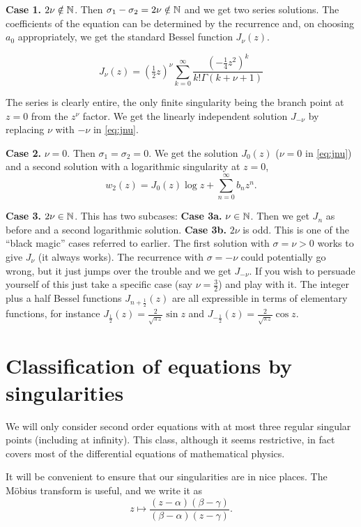 \documentclass{notes}
\theoremstyle{plain}
\begin{document}
\textbf{Case 1.}  $2 \nu \notin \mathbb{N}$.  Then $\sigma_1 - \sigma_2 = 2
\nu \notin \mathbb{N}$ and we get two series solutions.  The coefficients of
the equation can be determined by the recurrence and, on choosing
$a_0$ appropriately, we get the standard Bessel function $J_\nu(z)$.

\begin{equation}\label{eq:jnu}
J_\nu(z) = \left( \tfrac{1}{2} z \right)^\nu
\sum_{k=0}^\infty \frac{\left( - \tfrac{1}{4} z^2 \right)^k}
{k! \Gamma(k+\nu+1)}
\end{equation}

The series is clearly entire, the only finite singularity being the branch
point at $z=0$ from the $z^\nu$ factor. We get the linearly independent
solution $J_{-\nu}$ by replacing $\nu$ with $-\nu$ in \eqref{eq:jnu}.

\textbf{Case 2.}  $\nu = 0$.  Then $\sigma_1 = \sigma_2 = 0$.  We get
the solution $J_0(z)$ ($\nu = 0$ in \eqref{eq:jnu}) and a second
solution with a logarithmic singularity at $z=0$,
\[
w_2(z) = J_0(z) \log z + \sum_{n=0}^\infty b_n z^n.
\]

\textbf{Case 3.}  $2 \nu \in \mathbb{N}$.  This has two subcases:
\textbf{Case 3a.} $\nu \in \mathbb{N}$.  Then we get $J_n$ as before and a
second logarithmic solution. \textbf{Case 3b.}  $2 \nu$ is odd.  This
is one of the ``black magic'' cases referred to earlier.  The
first solution with $\sigma = \nu > 0$ works to give
$J_\nu$ (it always works).  The recurrence with $\sigma = -\nu$
could potentially go wrong, but it just jumps over the trouble and we
get $J_{-\nu}$.  If you wish to persuade yourself of this just take a
specific case (say $\nu = \frac{3}{2}$) and play with it.
The integer plus a half Bessel functions $J_{n + \frac{1}{2}}(z)$ are all
expressible in terms of elementary functions, for instance  $J_{\frac{1}{2}}(z)
= \frac{2}{\sqrt{\pi z}} \sin z$ and $J_{-\frac{1}{2}}(z) =
\frac{2}{\sqrt{\pi z}} \cos z$.

\section{Classification of equations by singularities}

We will only consider second order equations with at most three
regular singular points (including at infinity).  This class, although
it seems restrictive, in fact covers most of the differential equations of
mathematical physics.

It will be convenient to ensure that our singularities are in nice
places.  The M\"obius transform is useful, and we write it as
\begin{equation}\label{eq:mobius}
z \mapsto \frac{ (z - \alpha)(\beta - \gamma)}{(\beta-\alpha)(z - \gamma)}.
\end{equation}
\end{document}
